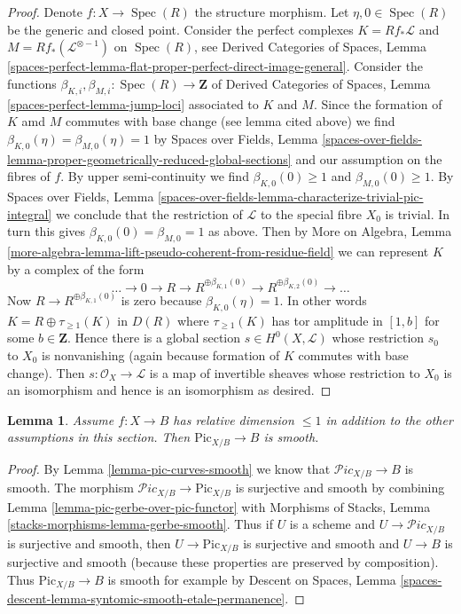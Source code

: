 \documentclass{stacks-project}
\theoremstyle{plain}
\newtheorem{lemma}[subsection]{Lemma}
\theoremstyle{definition}
\theoremstyle{remark}
\numberwithin{equation}{subsection}
\def\Spec{\mathop{\mathrm{Spec}}}
\def\Picardstack{\mathcal{P}\!\mathit{ic}}
\def\Picardfunctor{\mathrm{Pic}}
\begin{document}
\begin{proof}
\medskip\noindent
Denote $f : X \to \Spec(R)$ the structure morphism.
Let $\eta, 0 \in \Spec(R)$ be the generic and closed point.
Consider the perfect complexes
$K = Rf_*\mathcal{L}$ and $M = Rf_*(\mathcal{L}^{\otimes -1})$
on $\Spec(R)$, see Derived Categories of Spaces, Lemma
\ref{spaces-perfect-lemma-flat-proper-perfect-direct-image-general}.
Consider the functions
$\beta_{K, i}, \beta_{M, i} : \Spec(R) \to \mathbf{Z}$
of Derived Categories of Spaces, Lemma
\ref{spaces-perfect-lemma-jump-loci} associated to $K$ and $M$.
Since the formation of $K$ amd $M$ commutes with
base change (see lemma cited above) we find
$\beta_{K, 0}(\eta) = \beta_{M, 0}(\eta) = 1$ by
Spaces over Fields, Lemma
\ref{spaces-over-fields-lemma-proper-geometrically-reduced-global-sections}
and our assumption on the fibres of $f$.
By upper semi-continuity we find
$\beta_{K, 0}(0) \geq 1$ and $\beta_{M, 0}(0) \geq 1$.
By 
Spaces over Fields, Lemma
\ref{spaces-over-fields-lemma-characterize-trivial-pic-integral}
we conclude that the restriction of $\mathcal{L}$
to the special fibre $X_0$ is trivial. In turn this gives
$\beta_{K, 0}(0) = \beta_{M, 0} = 1$ as above.
Then by More on Algebra, Lemma
\ref{more-algebra-lemma-lift-pseudo-coherent-from-residue-field}
we can represent $K$ by a complex of the form
$$
\ldots \to 0 \to R \to R^{\oplus \beta_{K, 1}(0)} \to
R^{\oplus \beta_{K, 2}(0)} \to \ldots
$$
Now $R \to R^{\oplus \beta_{K, 1}(0)}$ is zero
because $\beta_{K, 0}(\eta) = 1$. In other words
$K = R \oplus \tau_{\geq 1}(K)$ in $D(R)$ where $\tau_{\geq 1}(K)$
has tor amplitude in $[1, b]$ for some $b \in \mathbf{Z}$.
Hence there is a global section $s \in H^0(X, \mathcal{L})$
whose restriction $s_0$
to $X_0$ is nonvanishing (again because formation of $K$
commutes with base change). Then $s : \mathcal{O}_X \to \mathcal{L}$
is a map of invertible sheaves whose restriction to $X_0$
is an isomorphism and hence is an isomorphism as desired.
\end{proof}

\begin{lemma}
\label{lemma-pic-functor-curves-smooth}
Assume $f : X \to B$ has relative dimension $\leq 1$ in addition to
the other assumptions in this section. Then $\Picardfunctor_{X/B} \to B$
is smooth.
\end{lemma}

\begin{proof}
By Lemma \ref{lemma-pic-curves-smooth} we know that
$\Picardstack_{X/B} \to B$ is smooth. The morphism
$\Picardstack_{X/B} \to \Picardfunctor_{X/B}$ is surjective
and smooth by combining Lemma \ref{lemma-pic-gerbe-over-pic-functor} with
Morphisms of Stacks, Lemma \ref{stacks-morphisms-lemma-gerbe-smooth}.
Thus if $U$ is a scheme and $U \to \Picardstack_{X/B}$ is surjective
and smooth, then $U \to \Picardfunctor_{X/B}$ is surjective and smooth
and $U \to B$ is surjective and smooth (because these properties
are preserved by composition). Thus $\Picardfunctor_{X/B} \to B$
is smooth for example by
Descent on Spaces, Lemma
\ref{spaces-descent-lemma-syntomic-smooth-etale-permanence}.
\end{proof}
\end{document}
